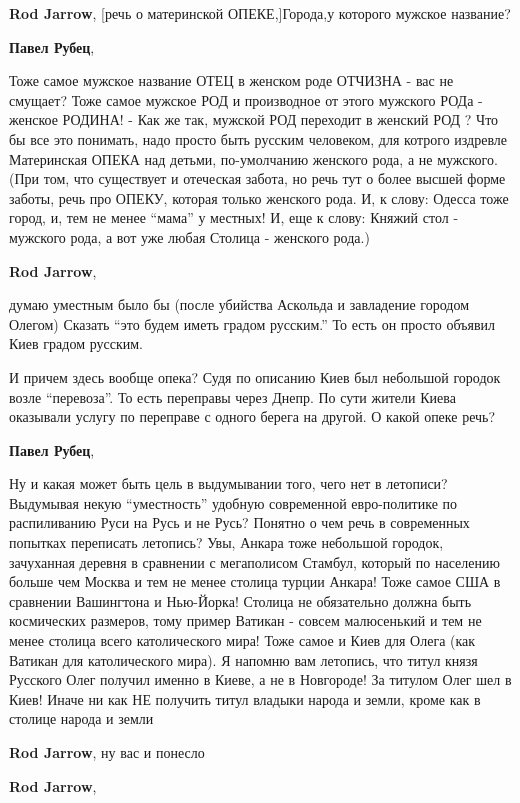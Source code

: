 \begin{itemize}
\begin{itemize}
\textbf{Rod Jarrow}, [речь о материнской ОПЕКЕ,]Города,у которого мужское название?

\textbf{Павел Рубец}, 

Тоже самое мужское название ОТЕЦ в женском роде ОТЧИЗНА - вас не смущает? Тоже
самое мужское РОД и производное от этого мужского РОДа - женское РОДИНА! - Как
же так, мужской РОД переходит в женский РОД ? Что бы все это понимать, надо
просто быть русским человеком, для котрого издревле Материнская ОПЕКА над
детьми, по-умолчанию женского рода, а не мужского. (При том, что существует и
отеческая забота, но речь тут о более высшей форме заботы, речь про ОПЕКУ,
которая только женского рода. И, к слову: Одесса тоже город, и, тем не менее
\enquote{мама} у местных! И, еще к слову: Княжий стол - мужского рода, а вот уже любая
Столица - женского рода.)

\textbf{Rod Jarrow}, 

думаю уместным было бы (после убийства Аскольда и завладение городом Олегом)
Сказать \enquote{это будем иметь градом русским.} То есть он просто объявил
Киев градом русским.

И причем здесь вообще опека? Судя по описанию Киев был небольшой городок возле
\enquote{перевоза}. То есть переправы через Днепр. По сути жители Киева
оказывали услугу по переправе с одного берега на другой. О какой опеке речь?

\textbf{Павел Рубец}, 

Ну и какая может быть цель в выдумывании того, чего нет в летописи? Выдумывая
некую \enquote{уместность} удобную современной евро-политике по распиливанию Руси на
Русь и не Русь? Понятно о чем речь в современных попытках переписать летопись?
Увы, Анкара тоже небольшой городок, зачуханная деревня в сравнении с
мегаполисом Стамбул, который по населению больше чем Москва и тем не менее
столица турции Анкара! Тоже самое США в сравнении Вашингтона и Нью-Йорка!
Столица не обязательно должна быть космических размеров, тому пример Ватикан -
совсем малюсенький и тем не менее столица всего католического мира! Тоже самое
и Киев для Олега (как Ватикан для католического мира). Я напомню вам летопись,
что титул князя Русского Олег получил именно в Киеве, а не в Новгороде! За
титулом Олег шел в Киев! Иначе ни как НЕ получить титул владыки народа и земли,
кроме как в столице народа и земли

\textbf{Rod Jarrow}, ну вас и понесло

\textbf{Rod Jarrow}, 


\end{itemize}
\end{itemize}
